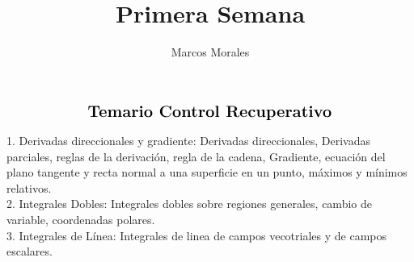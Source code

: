 \documentclass{article}
\author{Marcos Morales}
\affil{Universidad Finis Terrae}
\title{Primera Semana\\}
\theoremstyle{definition}
\begin{document}
\setlength{\parindent}{0cm}

\begin{align*}
    \Large{\textbf{Temario Control Recuperativo}}
\end{align*}



1.  Derivadas direccionales y gradiente: Derivadas direccionales, Derivadas parciales, reglas de la derivación, regla de la cadena, Gradiente, ecuación del plano tangente y recta normal a una superficie en un punto, máximos y mínimos relativos.  \\

2.   Integrales Dobles: Integrales dobles sobre regiones generales, cambio de variable, coordenadas polares. \\

3.    Integrales de Línea: Integrales de linea de campos vecotriales y de campos escalares.
\end{document}
